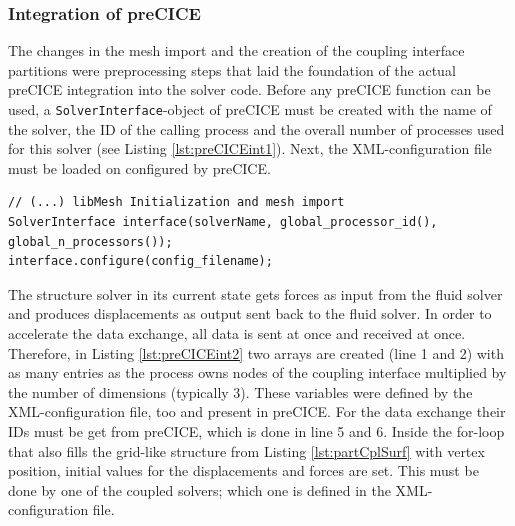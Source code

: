   \subsubsection{Integration of preCICE}\label{sec:Coupl-Impl-Integration}
   The changes in the mesh import and the creation of the coupling interface partitions were preprocessing steps that laid the foundation of the actual preCICE integration into the solver code. Before any preCICE function can be used, a \texttt{SolverInterface}-object of preCICE must be created with the name of the solver, the ID of the calling process and the overall number of processes used for this solver (see Listing \ref{lst:preCICEint1}). Next, the XML-configuration file must be loaded on configured by preCICE.
\begin{lstlisting}[caption=preCICE Integration Part 1,label=lst:preCICEint1,keepspaces=true]
// (...) libMesh Initialization and mesh import
SolverInterface interface(solverName, global_processor_id(), global_n_processors());
interface.configure(config_filename);
\end{lstlisting}
   The structure solver in its current state gets forces as input from the fluid solver and produces displacements as output sent back to the fluid solver. In order to accelerate the data exchange, all data is sent at once and received at once. Therefore, in Listing \ref{lst:preCICEint2} two arrays are created (line 1 and 2) with as many entries as the process owns nodes of the coupling interface multiplied by the number of dimensions (typically 3). These variables were defined by the XML-configuration file, too and present in preCICE. For the data exchange their IDs must be get from preCICE, which is done in line 5 and 6. Inside the for-loop that also fills the grid-like structure from Listing \ref{lst:partCplSurf} with vertex position, initial values for the displacements and forces are set. This must be done by one of the coupled solvers; which one is defined in the XML-configuration file.

